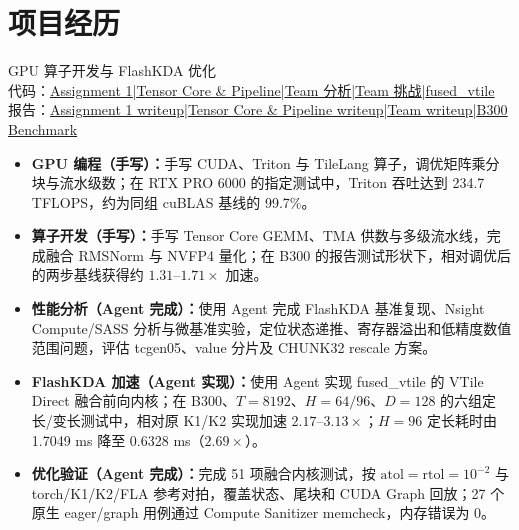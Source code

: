 \documentclass[UTF8,10pt,a4paper,fontset=none]{ctexart}
\newcommand{\project}[2]{\par\addvspace{7pt}\noindent{\sffamily\bfseries\fontsize{10.5}{14}\selectfont #1}\hfill {\small #2}\par\nobreak\vspace{2pt}}
\newcommand{\lk}[2]{\href{#1}{\underline{#2}}}
\begin{document}
\section{项目经历}
\project{未名 HPC × LCPU AI Infra 训练营}{ }
{\small\sffamily GPU 算子开发与 FlashKDA 优化}\\
{\small 代码：\lk{https://github.com/Hniii98/wmhpc-training-camp-x-lcpu-ai-infra-seminars/tree/main/assignment01}{Assignment 1}\enspace |\enspace \lk{https://github.com/Hniii98/wmhpc-training-camp-x-lcpu-ai-infra-seminars/tree/main/assignment02}{Tensor Core \& Pipeline}\enspace |\enspace \lk{https://github.com/Hniii98/FlashKDA/tree/chunk16-profile/profile}{Team 分析}\enspace |\enspace \lk{https://github.com/Hniii98/FlashKDA/tree/kda-chunk32-rescale}{Team 挑战}\enspace |\enspace \lk{https://github.com/Hniii98/FlashKDA/tree/fused_vtile}{fused\_vtile}\\
报告：\lk{https://github.com/Hniii98/wmhpc-training-camp-x-lcpu-ai-infra-seminars/blob/main/assignment01/assignment01_writeup.pdf}{Assignment 1 writeup}\enspace |\enspace \lk{https://github.com/Hniii98/wmhpc-training-camp-x-lcpu-ai-infra-seminars/blob/main/assignment02/assignment02_writeup.pdf}{Tensor Core \& Pipeline writeup}\enspace |\enspace \lk{https://github.com/Hniii98/wmhpc-training-camp-x-lcpu-ai-infra-seminars/blob/main/assignment02/assignment02_team_writeup.pdf}{Team writeup}\enspace |\enspace \lk{https://github.com/Hniii98/FlashKDA/blob/fused_vtile/BENCHMARK_B300.md}{B300 Benchmark}}
\begin{itemize}
\item \textbf{GPU 编程（手写）：}手写 CUDA、Triton 与 TileLang 算子，调优矩阵乘分块与流水级数；在 RTX PRO 6000 的指定测试中，Triton 吞吐达到 234.7 TFLOPS，约为同组 cuBLAS 基线的 99.7\%。
\item \textbf{算子开发（手写）：}手写 Tensor Core GEMM、TMA 供数与多级流水线，完成融合 RMSNorm 与 NVFP4 量化；在 B300 的报告测试形状下，相对调优后的两步基线获得约 $1.31$--$1.71\times$ 加速。
\item \textbf{性能分析（Agent 完成）：}使用 Agent 完成 FlashKDA 基准复现、Nsight Compute/SASS 分析与微基准实验，定位状态递推、寄存器溢出和低精度数值范围问题，评估 tcgen05、value 分片及 CHUNK32 rescale 方案。
\item \textbf{FlashKDA 加速（Agent 实现）：}使用 Agent 实现 fused\_vtile 的 VTile Direct 融合前向内核；在 B300、$T=8192$、$H=64/96$、$D=128$ 的六组定长/变长测试中，相对原 K1/K2 实现加速 $2.17$--$3.13\times$；$H=96$ 定长耗时由 1.7049 ms 降至 0.6328 ms（$2.69\times$）。
\item \textbf{优化验证（Agent 完成）：}完成 51 项融合内核测试，按 $\mathrm{atol}=\mathrm{rtol}=10^{-2}$ 与 torch/K1/K2/FLA 参考对拍，覆盖状态、尾块和 CUDA Graph 回放；27 个原生 eager/graph 用例通过 Compute Sanitizer memcheck，内存错误为 0。
\end{itemize}
\end{document}
